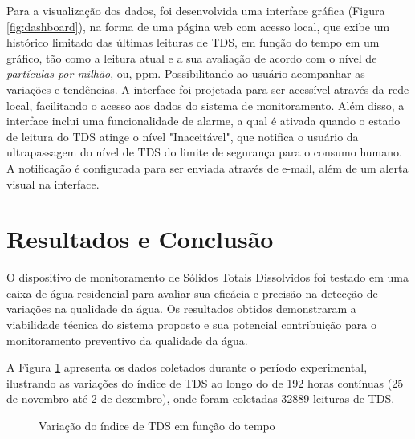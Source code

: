 \documentclass[12pt]{article}
\begin{document}
Para a visualização dos dados, foi desenvolvida uma interface gráfica (Figura \ref{fig:dashboard}), na forma de uma página web com acesso local, que exibe um histórico limitado das últimas leituras de TDS, em função do tempo em um gráfico, tão como a leitura atual e a sua avaliação de acordo com o nível de \textit{partículas por milhão}, ou, ppm. Possibilitando ao usuário acompanhar as variações e tendências. A interface foi projetada para ser acessível através da rede local, facilitando o acesso aos dados do sistema de monitoramento. Além disso, a interface inclui uma funcionalidade de alarme, a qual é ativada quando o estado de leitura do TDS atinge o nível "Inaceitável", que notifica o usuário da ultrapassagem do nível de TDS do limite de segurança para o consumo humano. A notificação é configurada para ser enviada através de e-mail, além de um alerta visual na interface.


\section{Resultados e Conclusão}

O dispositivo de monitoramento de Sólidos Totais Dissolvidos foi testado em uma caixa de água residencial para avaliar sua eficácia e precisão na detecção de variações na qualidade da água. Os resultados obtidos demonstraram a viabilidade técnica do sistema proposto e sua potencial contribuição para o monitoramento preventivo da qualidade da água.

A Figura \ref{fig:resultados} apresenta os dados coletados durante o período experimental, ilustrando as variações do índice de TDS ao longo do de 192 horas contínuas (25 de novembro até 2 de dezembro), onde foram coletadas 32889 leituras de TDS.

\pgfplotsset{compat=1.18}
\begin{figure}[htbp]
\centering
{}
\caption{Variação do índice de TDS em função do tempo}
\label{fig:resultados}
\end{figure}
\end{document}
